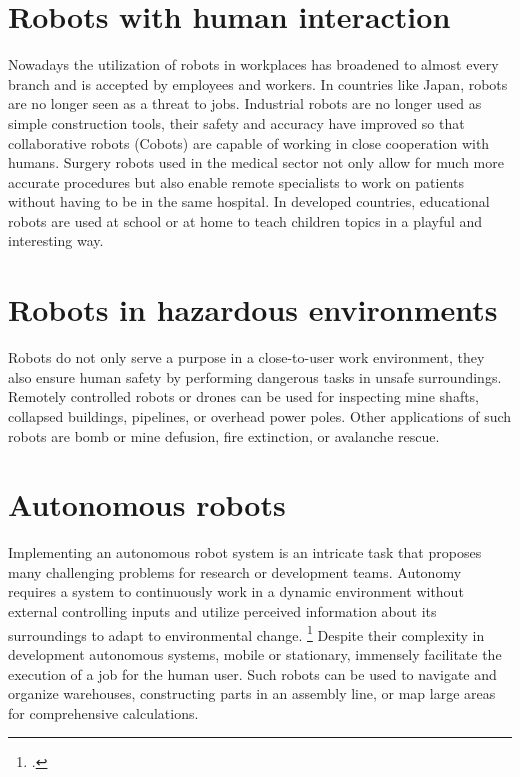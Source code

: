 \section{Robots with human interaction}
Nowadays the utilization of robots in workplaces has broadened to almost every branch and is accepted by employees and workers. In countries like Japan, robots are no longer seen as a threat to jobs. 
Industrial robots are no longer used as simple construction tools, their safety and accuracy have improved so that collaborative robots (Cobots) are capable of working in close cooperation with humans. 
Surgery robots used in the medical sector not only allow for much more accurate procedures but also enable remote specialists to work on patients without having to be in the same hospital. 
In developed countries, educational robots are used at school or at home to teach children topics in a playful and interesting way.

\section{Robots in hazardous environments}
Robots do not only serve a purpose in a close-to-user work environment, they also ensure human safety by performing dangerous tasks in unsafe surroundings. 
Remotely controlled robots or drones can be used for inspecting mine shafts, collapsed buildings, pipelines, or overhead power poles.
Other applications of such robots are bomb or mine defusion, fire extinction, or avalanche rescue.

\section{Autonomous robots}
Implementing an autonomous robot system is an intricate task that proposes many challenging problems for research or development teams. Autonomy requires a system to continuously work in a dynamic environment without external controlling inputs and utilize perceived information about its surroundings to adapt to environmental change. \footcite[Pages 1-2]{bekey2005autonomous}
Despite their complexity in development autonomous systems, mobile or stationary, immensely facilitate the execution of a job for the human user.
Such robots can be used to navigate and organize warehouses, constructing parts in an assembly line, or map large areas for comprehensive calculations.



